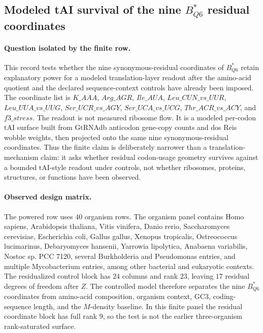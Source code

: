 \subsection{Modeled tAI survival of the nine $B^{*}_{Q6}$ residual coordinates}
\label{sec:bioreality-q6-modeled-tai-survival}

\paragraph{Question isolated by the finite row.}
This record tests whether the nine synonymous-residual coordinates of $B^{*}_{Q6}$ retain explanatory power for a modeled translation-layer readout after the amino-acid quotient and the declared sequence-context controls have already been imposed.  The coordinate list is
$K\_AAA$, $Arg\_AGR$, $Ile\_AUA$, $Leu\_CUN\_vs\_UUR$, $Leu\_UUA\_vs\_UUG$, $Ser\_UCR\_vs\_AGY$, $Ser\_UCA\_vs\_UCG$, $Thr\_ACR\_vs\_ACY$, and $f3\_stress$.  The readout is not measured ribosome flow.  It is a modeled per-codon tAI surface built from GtRNAdb anticodon gene-copy counts and dos Reis wobble weights, then projected onto the same nine synonymous-residual coordinates.  Thus the finite claim is deliberately narrower than a translation-mechanism claim: it asks whether residual codon-usage geometry survives against a bounded tAI-style readout under controls, not whether ribosomes, proteins, structures, or functions have been observed.

\paragraph{Observed design matrix.}
The powered row uses $40$ organism rows.  The organism panel contains Homo sapiens, Arabidopsis thaliana, Vitis vinifera, Danio rerio, Saccharomyces cerevisiae, Escherichia coli, Gallus gallus, Xenopus tropicalis, Ostreococcus lucimarinus, Debaryomyces hansenii, Yarrowia lipolytica, Anabaena variabilis, Nostoc sp. PCC 7120, several Burkholderia and Pseudomonas entries, and multiple Mycobacterium entries, among other bacterial and eukaryotic contexts.  The residualized control block has $24$ columns and rank $23$, leaving $17$ residual degrees of freedom after $Z$.  The controlled model therefore separates the nine $B^{*}_{Q6}$ coordinates from amino-acid composition, organism context, GC3, coding-sequence length, and the $M$-density baseline.  In this finite panel the residual coordinate block has full rank $9$, so the test is not the earlier three-organism rank-saturated surface.

